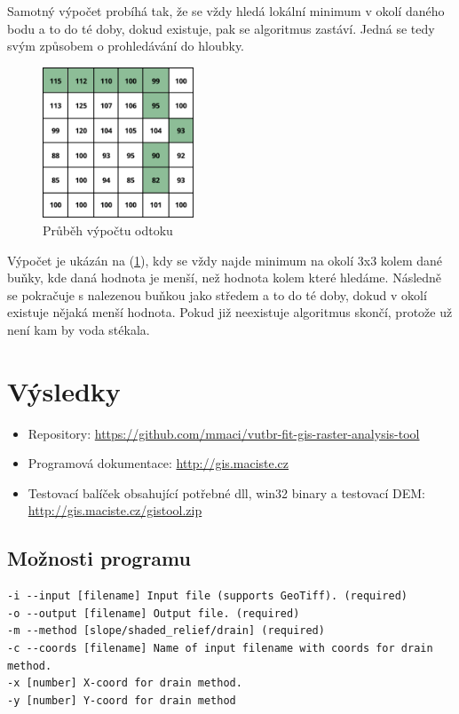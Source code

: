 \documentclass[12pt,a4paper,titlepage,final]{report}
\begin{document}
Samotný výpočet probíhá tak, že se vždy hledá lokální minimum v okolí daného bodu a to do té doby, dokud existuje, pak se algoritmus zastáví. Jedná se tedy svým způsobem o prohledávání do hloubky.

\begin{figure}[ht]
\begin{center}
\includegraphics[width=0.4\textwidth]{images/drain.pdf}
\caption{Průběh výpočtu odtoku}
\label{fig:drain}
\end{center}
\end{figure}

Výpočet je ukázán na (\ref{fig:drain}), kdy se vždy najde minimum na okolí 3x3 kolem dané buňky, kde daná hodnota je menší, než hodnota kolem které hledáme. Následně se pokračuje s nalezenou buňkou jako středem a to do té doby, dokud v okolí existuje nějaká menší hodnota. Pokud již neexistuje algoritmus skončí, protože už není kam by voda stékala.

\clearpage

\section{Výsledky}

\begin{itemize}
	\item Repository: \url{https://github.com/mmaci/vutbr-fit-gis-raster-analysis-tool}
	\item Programová dokumentace: \url{http://gis.maciste.cz}
	\item Testovací balíček obsahující potřebné dll, win32 binary a testovací DEM: \url{http://gis.maciste.cz/gistool.zip}
\end{itemize}

\subsection{Možnosti programu}
\begin{verbatim}
-i --input [filename] Input file (supports GeoTiff). (required)
-o --output [filename] Output file. (required)
-m --method [slope/shaded_relief/drain] (required)
-c --coords [filename] Name of input filename with coords for drain method.
-x [number] X-coord for drain method.
-y [number] Y-coord for drain method
\end{verbatim}
\end{document}
